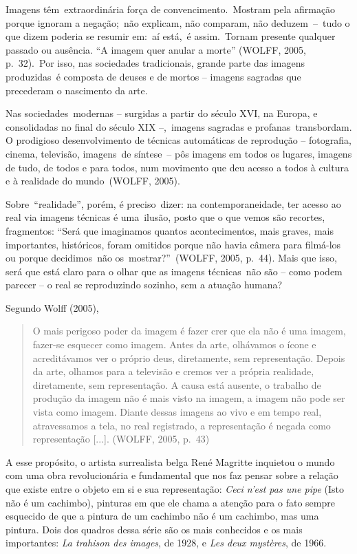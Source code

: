 \documentclass[
  letterpaper,
]{scrbook}
\begin{document}
Imagens têm~extraordinária força de convencimento.~Mostram pela
afirmação porque ignoram a negação;~não explicam, não comparam, não
deduzem~--~tudo o que dizem poderia se resumir em:~aí está,~é
assim.~Tornam presente qualquer passado ou ausência. ``A imagem quer
anular a morte'' (WOLFF, 2005, p.~32).~Por isso, nas sociedades
tradicionais, grande parte das imagens produzidas~é composta de deuses e
de mortos -- imagens sagradas que precederam o nascimento da arte.~

Nas sociedades~modernas -- surgidas a partir do século XVI, na Europa, e
consolidadas no final do século XIX --,~imagens sagradas e
profanas~transbordam. O prodigioso desenvolvimento de técnicas
automáticas de reprodução -- fotografia, cinema, televisão, imagens~de
síntese~-- pôs imagens em todos os lugares, imagens de tudo, de todos e
para todos, num movimento que deu acesso a todos à cultura e à realidade
do mundo~(WOLFF, 2005).

Sobre~``realidade'', porém, é preciso~dizer: na contemporaneidade, ter
acesso ao real via imagens técnicas é uma~ilusão, posto que o que vemos
são recortes, fragmentos: ``Será que imaginamos quantos acontecimentos,
mais graves, mais importantes, históricos, foram omitidos porque não
havia câmera para filmá-los ou porque decidimos~não
os~mostrar?''~(WOLFF, 2005, p.~44). Mais que isso, será que está claro
para o olhar que as imagens técnicas~não são -- como podem parecer -- o
real se reproduzindo sozinho, sem a atuação humana? ~

Segundo Wolff (2005),~

\begin{quote}
O mais perigoso poder da imagem é fazer crer que ela não é uma imagem,
fazer-se esquecer como imagem. Antes da arte, olhávamos o ícone e
acreditávamos ver o próprio deus, diretamente, sem representação. Depois
da arte, olhamos para a televisão e cremos ver a própria realidade,
diretamente, sem representação. A causa está ausente, o trabalho de
produção da imagem não é mais visto na imagem, a imagem não pode ser
vista como imagem. Diante dessas imagens ao vivo e em tempo real,
atravessamos a tela, no real registrado, a representação é negada como
representação {[}...{]}. (WOLFF, 2005, p.~43)~
\end{quote}

A esse propósito, o artista surrealista belga René Magritte inquietou o
mundo com uma obra revolucionária e fundamental que nos faz pensar sobre
a relação que existe entre o objeto em si e sua representação:
\emph{Ceci n'est pas une pipe} (Isto não é um cachimbo), pinturas em que
ele chama a atenção para o fato sempre esquecido de que a pintura de um
cachimbo não é um cachimbo, mas uma pintura. Dois dos quadros dessa
série são os mais conhecidos e os mais importantes: \emph{La trahison
des images}, de 1928, e \emph{Les deux mystères}, de 1966.
\end{document}
